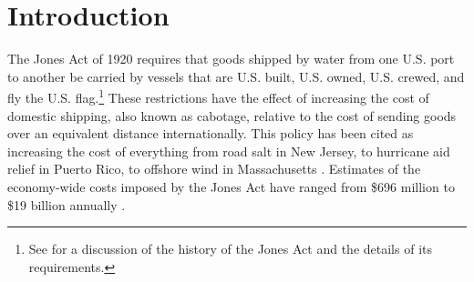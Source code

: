 \documentclass[12pt]{article}
\begin{document}
\newpage
\setcounter{page}{1} \onehalfspace


\section{Introduction} \label{sec:Intro}

The Jones Act of 1920 requires that goods shipped by water from one U.S. port to another be carried by vessels that are U.S. built, U.S. owned, U.S. crewed, and fly the U.S. flag.\footnote{See \cite{CRS2019} for a discussion of the history of the Jones Act and the details of its requirements.} These restrictions have the effect of increasing the cost of domestic shipping, also known as cabotage, relative to the cost of sending goods over an equivalent distance internationally. This policy has been cited as increasing the cost of everything from road salt in New Jersey, to hurricane aid relief in Puerto Rico, to offshore wind in Massachusetts \citep{melitz_econofact, Lee2023}. Estimates of the economy-wide costs imposed by the Jones Act have ranged from \$696 million to \$19 billion annually \citep{USITC2002,OECD2019}.
\end{document}
